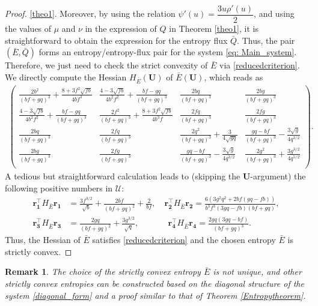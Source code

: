 \documentclass[11pt]{article}
\numberwithin{equation}{section}
\newtheorem{counter example}[theorem]{Counter Example}
\newtheorem{remark}[theorem] {Remark}
\begin{document}
{\begin{proof}
\ref{theo1}. Moreover, by using the relation $\psi'(u)=\dfrac{3u\rho'(u)}{2}$, and using the values of $\mu$ and $\nu$ in the expression of $Q$ in Theorem \ref{theo1}, it is straightforward to obtain the expression for the entropy flux $\bar{Q}$. Thus, the pair $(\bar{E}, \bar{Q})$ forms an entropy/entropy-flux pair for the system \eqref{eq: Main_system}. Therefore, we just need to check the strict convexity of $\bar E$ via \eqref{reducedcriterion}. 
We directly compute the Hessian  $H_{\bar E}(\mathbf{U})$ of $\bar E(\mathbf{U})$, which reads as
\begin{align*}
    \left(\begin{array}{cccc}\frac{2b^2}{(bf+gq)^3}+\frac{8+3f^{2}\sqrt{fb}}{4bf^3}&\frac{4-3\sqrt{fb}}{4b^2f^2}+\frac{bf-gq}{(bf+gq)^3}&\frac{2bq}{(bf+gq)^3}&\frac{2bg}{(bf+gq)^3}\\
    \frac{4-3\sqrt{fb}}{4b^2f^2}+\frac{bf-gq}{(bf+gq)^3}&\frac{2f^2}{(bf+gq)^3}+\frac{8+3f^{2}\sqrt{fb}}{4b^3f}&\frac{2fq}{(bf+gq)^3}&\frac{2fg}{(bf+gq)^3}\\\frac{2bq}{(bf+gq)^3}&\frac{2fq}{(bf+gq)^3}&\frac{2q^2}{(bf+gq)^3}+\frac{3}{4\sqrt{gq}}&\frac{gq-bf}{(bf+gq)^3}-\frac{3\sqrt{g}}{4q^{3/2}}\\\frac{2bg}{(bf+gq)^3}&\frac{2fg}{(bf+gq)^3}&\frac{gq-bf}{(bf+gq)^3}-\frac{3\sqrt{g}}{4q^{3/2}}&\frac{2g^2}{(bf+gq)^3}+\frac{3g^{3/2}}{4q^{5/2}}\\\end{array}\right).
\end{align*}
A tedious but straightforward calculation leads to (skipping the $\mathbf{U}$-argument) the following positive numbers 
in $\mathcal U$:
\begin{align*}
\mathbf{r_1^\top } H_{\bar E} \mathbf{r_1}&=\frac{3f^{3/2}}{\sqrt{b}}+\frac{2bf}{(bf+gq)^2}+\frac{2}{bf},\quad
\mathbf{r_2^\top }H_{\bar E} \mathbf{r_2}=
\frac{6\left(3g^2q^2+2bf(gq-fb)\right)}{b^3f^3(3gq-fb)(bf+gq)},\\
\mathbf{r_3^\top } H_{\bar E} \mathbf{r_3}&=\frac{2gq}{(bf+gq)^2}+\frac{3g^{3/2}}{\sqrt{q}},~~\quad \qquad\mathbf{r_4^\top } H_{\bar E} \mathbf{r_4}=\frac{2gq(3gq-bf)}{(bf+gq)^3}.
\end{align*}
Thus, the Hessian of $\bar E$ satisfies \eqref{reducedcriterion} and the chosen entropy $\bar E$ is strictly convex.
\end{proof}
\begin{remark}\label{rem42}
The choice of the strictly convex entropy $\bar E$  is not unique, and other strictly convex entropies can be constructed based on the diagonal structure of the system \eqref{diagonal_form} and a proof similar to that of Theorem \ref{Entropytheorem}. 

\end{remark}}
\end{document}
